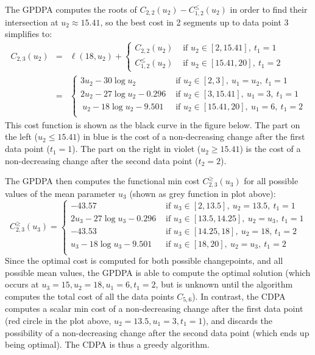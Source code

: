 \documentclass{article}
\begin{document}
\newpage


The GPDPA computes the roots of $C_{2,2}(u_2)-C^\leq_{1,2}(u_2)$ in
order to find their intersection at $u_2\approx15.41$, so the best
cost in 2 segments up to data point 3 simplifies to:
\begin{eqnarray}
C_{2,3}(u_2)  &=&\ell(18, u_2) + 
                \begin{cases}
                  C_{2,2}(u_2) & \text{ if }u_2\in[2, 15.41],\ t_1=1\\
                  C^\leq_{1,2}(u_2)& \text{ if }u_2\in[15.41, 20],\ t_1=2
                \end{cases}\\
            &=&
                \begin{cases}
                  3u_2 -30 \log u_2 & \text{ if } u_2\in[2,3],\ u_1=u_2,\ t_1=1\\
                  2u_2 -27 \log u_2 -0.296 & \text{ if } u_2\in[3, 15.41],\ u_1=3,\ t_1=1\\\
                  u_2 -18 \log u_2 -9.501  & \text{ if } u_2\in[15.41, 20],\ u_1=6,\ t_1=2\\
                \end{cases}
\end{eqnarray}
This cost function is shown as the black curve in the figure
below. The part on the left ($u_2\leq 15.41$) in blue is the cost of a
non-decreasing change after the first data point ($t_1=1$). The part
on the right in violet ($u_2\geq 15.41$) is the cost of a
non-decreasing change after the second data point ($t_2=2$). 



The GPDPA then computes the functional min cost $C^\geq_{2,3}(u_3)$ for all
possible values of the mean parameter $u_3$ (shown as grey function in plot
above):
\begin{equation}
C^\geq_{2,3}(u_3)  =
\begin{cases}
  -43.57 & \text{ if } u_3\in[2, 13.5],\ u_2=13.5,\ t_1=1\\
  2u_3 -27 \log u_3 -0.296 & \text{ if } u_3\in[13.5, 14.25],\ u_2=u_3,\ t_1=1\\
  -43.53 & \text{ if } u_3\in[14.25, 18],\ u_2=18,\, t_1=2\\
  u_3 -18 \log u_3 -9.501  & \text{ if } u_3\in[18, 20],\ u_2=u_3,\ t_1=2\\
\end{cases}
\end{equation}
Since the optimal cost is computed for both possible changepoints, and
all possible mean values, the GPDPA is able to compute the optimal
solution (which occurs at $u_3=15, u_2=18, u_1=6, t_1=2$, but is
unknown until the algorithm computes the total cost of all the data
points $C_{5,6}$). In contrast, the CDPA computes a scalar min cost of
a non-decreasing change after the first data point (red circle in the
plot above, $u_2=13.5, u_1=3, t_1=1$), and discards the possibility of
a non-decreasing change after the second data point (which ends up
being optimal). The CDPA is thus a greedy algorithm.
\end{document}
